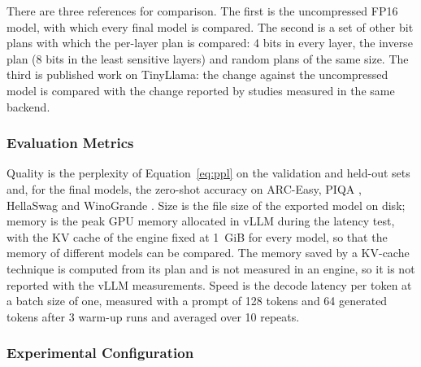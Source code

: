 \documentclass[num-refs]{wiley-article}
\begin{document}
There are three references for comparison. The first is the uncompressed FP16 model, with which every final model is compared. The second is a set of other bit plans with which the per-layer plan is compared: 4 bits in every layer, the inverse plan (8 bits in the least sensitive layers) and random plans of the same size. The third is published work on TinyLlama: the change against the uncompressed model is compared with the change reported by studies measured in the same backend.

\subsubsection{Evaluation Metrics}

Quality is the perplexity of Equation~\ref{eq:ppl} on the validation and held-out sets and, for the final models, the zero-shot accuracy on ARC-Easy, PIQA \cite{bisk2020piqa}, HellaSwag and WinoGrande \cite{sakaguchi2020winogrande}. Size is the file size of the exported model on disk; memory is the peak GPU memory allocated in vLLM during the latency test, with the KV cache of the engine fixed at 1~GiB for every model, so that the memory of different models can be compared. The memory saved by a KV-cache technique is computed from its plan and is not measured in an engine, so it is not reported with the vLLM measurements. Speed is the decode latency per token at a batch size of one, measured with a prompt of 128 tokens and 64 generated tokens after 3 warm-up runs and averaged over 10 repeats.

\subsubsection{Experimental Configuration}
\end{document}
